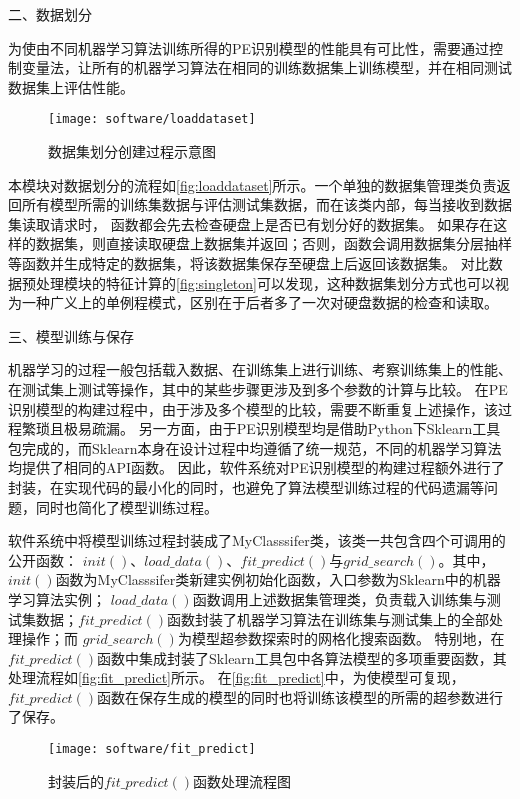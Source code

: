 二、数据划分

为使由不同机器学习算法训练所得的PE识别模型的性能具有可比性，需要通过控制变量法，让所有的机器学习算法在相同的训练数据集上训练模型，并在相同测试
数据集上评估性能。
\begin{figure}[htbp]
    \centering
    \texttt{[image: software/loaddataset]}
    \caption{\label{fig:loaddataset}数据集划分创建过程示意图}
\end{figure}

本模块对数据划分的流程如\autoref{fig:loaddataset}所示。一个单独的数据集管理类负责返回所有模型所需的训练集数据与评估测试集数据，而在该类内部，每当接收到数据集读取请求时，
函数都会先去检查硬盘上是否已有划分好的数据集。
如果存在这样的数据集，则直接读取硬盘上数据集并返回；否则，函数会调用数据集分层抽样等函数并生成特定的数据集，将该数据集保存至硬盘上后返回该数据集。
对比数据预处理模块的特征计算的\autoref{fig:singleton}可以发现，这种数据集划分方式也可以视为一种广义上的单例程模式，区别在于后者多了一次对硬盘数据的检查和读取。

三、模型训练与保存

机器学习的过程一般包括载入数据、在训练集上进行训练、考察训练集上的性能、在测试集上测试等操作，其中的某些步骤更涉及到多个参数的计算与比较。
在PE识别模型的构建过程中，由于涉及多个模型的比较，需要不断重复上述操作，该过程繁琐且极易疏漏。
另一方面，由于PE识别模型均是借助Python下Sklearn工具包完成的\cite{scikit-learn}，而Sklearn本身在设计过程中均遵循了统一规范，不同的机器学习算法均提供了相同的API函数。
因此，软件系统对PE识别模型的构建过程额外进行了封装，在实现代码的最小化的同时，也避免了算法模型训练过程的代码遗漏等问题，同时也简化了模型训练过程。

软件系统中将模型训练过程封装成了MyClasssifer类，该类一共包含四个可调用的公开函数：
$init()$、$load\_data()$、$fit\_predict()$与$grid\_search()$。其中，$init()$函数为MyClasssifer类新建实例初始化函数，入口参数为Sklearn中的机器学习算法实例；
$load\_data()$函数调用上述数据集管理类，负责载入训练集与测试集数据；$fit\_predict()$函数封装了机器学习算法在训练集与测试集上的全部处理操作；而
$grid\_search()$为模型超参数探索时的网格化搜索函数。
特别地，在$fit\_predict()$函数中集成封装了Sklearn工具包中各算法模型的多项重要函数，其处理流程如\autoref{fig:fit_predict}所示。
在\autoref{fig:fit_predict}中，为使模型可复现，$fit\_predict()$函数在保存生成的模型的同时也将训练该模型的所需的超参数进行了保存。

\begin{figure}[ht]
    \centering
    \texttt{[image: software/fit\_predict]}
    \caption{\label{fig:fit_predict}封装后的$fit\_predict()$函数处理流程图}
\end{figure}


